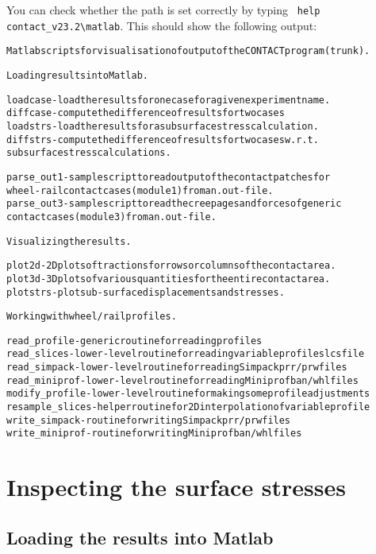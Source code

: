 \documentclass[12pt]{report}
\begin{document}
You can check whether the path is set correctly by typing
\verb+ help contact_v23.2\matlab+. This should show the following output:
\begin{alltt}\small
Matlab scripts for visualisation of output of the CONTACT program (trunk).

Loading results into Matlab.

  loadcase   - load the results for one case for a given experiment name.
  diffcase   - compute the difference of results for two cases
  loadstrs   - load the results for a subsurface stress calculation.
  diffstrs   - compute the difference of results for two cases w.r.t.
               subsurface stress calculations.

  parse_out1 - sample script to read output of the contact patches for
               wheel-rail contact cases (module 1) from an .out-file.
  parse_out3 - sample script to read the creepages and forces of generic
               contact cases (module 3) from an .out-file.

Visualizing the results.

  plot2d     - 2D plots of tractions for rows or columns of the contact area.
  plot3d     - 3D plots of various quantities for the entire contact area.
  plotstrs   - plot sub-surface displacements and stresses.

Working with wheel/rail profiles.

  read_profile    - generic routine for reading profiles
  read_slices     - lower-level routine for reading variable profile slcs file
  read_simpack    - lower-level routine for reading Simpack prr/prw files
  read_miniprof   - lower-level routine for reading Miniprof ban/whl files
  modify_profile  - lower-level routine for making some profile adjustments
  resample_slices - helper routine for 2D interpolation of variable profile
  write_simpack   - routine for writing Simpack prr/prw files
  write_miniprof  - routine for writing Miniprof ban/whl files
\end{alltt}

\section{Inspecting the surface stresses}
\label{sec:plot_surf}

\subsection{Loading the results into Matlab}
\end{document}
